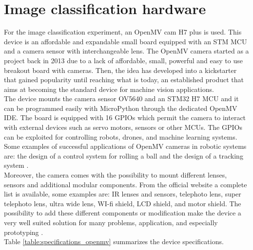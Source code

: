 \documentclass[12pt]{report}
\begin{document}
\section{Image classification hardware}
For the image classification experiment, an OpenMV cam H7 plus \autocite{abdelkader2017openmv} \autocite{openmv_web_page} is used. This device is an affordable and expandable small board equipped with an STM MCU and a camera sensor with interchangeable lens. The OpenMV camera started as a project \autocite{openmv_project} back in 2013 due to a lack of affordable, small, powerful and easy to use breakout board with cameras. Then, the idea has developed into a kickstarter that gained popularity until reaching what is today, an established product that aims at becoming the standard device for machine vision applications. \\
The device mounts the camera sensor OV5640 and an STM32 H7 MCU and it can be programmed easily with MicroPython through the dedicated OpenMV IDE. The board is equipped with 16 GPIOs which permit the camera to interact with external devices such as servo motors, sensors or other MCUs. The GPIOs can be exploited for controlling robots, drones, and machine learning systems. Some examples of successful applications of OpenMV cameras in robotic systems are: the design of a control system for rolling a ball \autocite{zhou2019design} and the design of a tracking system \autocite{wei2020design}.\\
Moreover, the camera comes with the possibility to mount different lenses, sensors and additional modular components. From the official website a complete list is available, some examples are: IR lenses and sensors, telephoto lens, super telephoto lens, ultra wide lens, WI-fi shield, LCD shield, and motor shield.
The possibility to add these different components or modification make the device a very well suited solution for many problems, application, and especially prototyping .\\
Table \ref{table:specifications_openmv} summarizes the device specifications.\\
\end{document}
